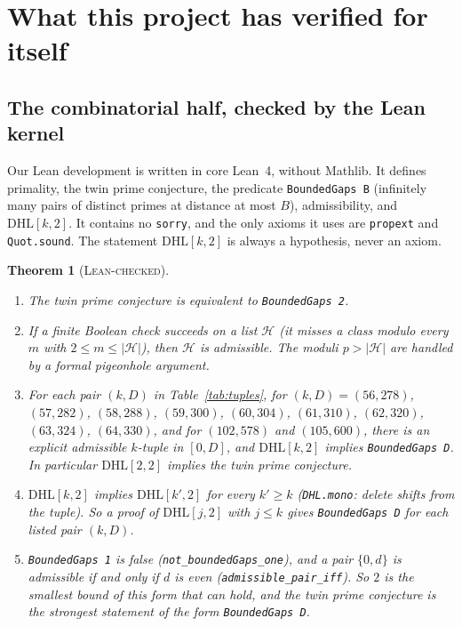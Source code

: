 \documentclass[11pt]{amsart}
\newtheorem{theorem}{Theorem}
\theoremstyle{definition}
\theoremstyle{remark}
\newcommand{\lbl}[1]{\textup{\textsc{#1}}}
\newcommand{\DHL}{\mathrm{DHL}}
\begin{document}
\section{What this project has verified for itself}

\subsection{The combinatorial half, checked by the Lean kernel}

Our Lean development is written in core Lean~4, without Mathlib. It defines
primality, the twin prime conjecture, the predicate \texttt{BoundedGaps B}
(infinitely many pairs of distinct primes at distance at most $B$),
admissibility, and $\DHL[k,2]$. It contains no \texttt{sorry}, and the only
axioms it uses are \texttt{propext} and \texttt{Quot.sound}. The statement
$\DHL[k,2]$ is always a hypothesis, never an axiom.

\begin{theorem}[\lbl{Lean-checked}]\label{thm:lean}
\begin{enumerate}
\item The twin prime conjecture is equivalent to \texttt{BoundedGaps 2}.
\item If a finite Boolean check succeeds on a list $\mathcal H$ (it misses a
class modulo every $m$ with $2\le m\le|\mathcal H|$), then $\mathcal H$ is
admissible. The moduli $p>|\mathcal H|$ are handled by a formal pigeonhole
argument.
\item For each pair $(k,D)$ in Table~\ref{tab:tuples}, for
$(k,D)=(56,278)$, $(57,282)$, $(58,288)$, $(59,300)$, $(60,304)$, $(61,310)$,
$(62,320)$, $(63,324)$, $(64,330)$, and for $(102,578)$ and $(105,600)$, there is an explicit admissible $k$-tuple in $[0,D]$, and
$\DHL[k,2]$ implies \texttt{BoundedGaps D}. In particular $\DHL[2,2]$ implies
the twin prime conjecture.
\item $\DHL[k,2]$ implies $\DHL[k',2]$ for every $k'\ge k$
(\texttt{DHL.mono}: delete shifts from the tuple). So a proof of $\DHL[j,2]$
with $j\le k$ gives \texttt{BoundedGaps D} for each listed pair $(k,D)$.
\item \texttt{BoundedGaps 1} is false (\texttt{not\_boundedGaps\_one}), and a
pair $\{0,d\}$ is admissible if and only if $d$ is even
(\texttt{admissible\_pair\_iff}). So $2$ is the smallest bound of this form
that can hold, and the twin prime conjecture is the strongest statement of the
form \texttt{BoundedGaps D}.
\end{enumerate}
\end{theorem}
\end{document}
